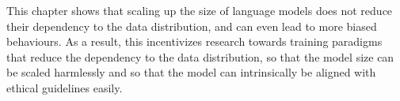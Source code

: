 \vspace{2em}

This chapter shows that scaling up the size of language models does not reduce their dependency to the data distribution, and can even lead to more biased behaviours. As a result, this incentivizes research towards training paradigms that reduce the dependency to the data distribution, so that the model size can be scaled harmlessly and so that the model can intrinsically be aligned with ethical guidelines easily.




% 
% 





